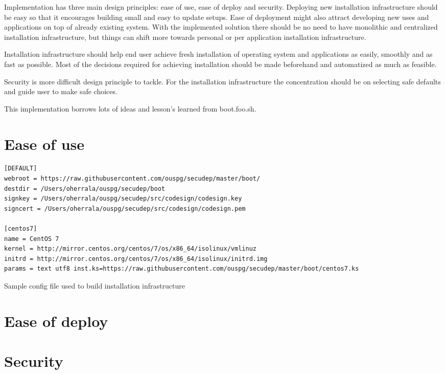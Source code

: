 
Implementation has three main design principles: ease of use, ease of
deploy and security. Deploying new installation infrastructure should
be easy so that it encourages building small and easy to update
setups. Ease of deployment might also attract developing new uses and
applications on top of already existing system. With the implemented
solution there should be no need to have monolithic and centralized
installation infrastructure, but things can shift more towards personal
or per application installation infrastructure.

Installation infrastructure should help end user achieve fresh
installation of operating system and applications as easily, smoothly
and as fast as possible. Most of the decisions required for achieving
installation should be made beforehand and automatized as much as
feasible.

Security is more difficult design principle to tackle. For the
installation infrastructure the concentration should be on selecting
safe defaults and guide user to make safe choices.

This implementation borrows lots of ideas and lesson's learned from
boot.foo.sh\cite{boot-foo-sh}.

\section{Ease of use}

\begin{table}[!ht]
\label{list:config}
  \begin{adjustwidth}{-3.5cm}{}
    \begin{scriptsize}
\begin{verbatim}
[DEFAULT]
webroot = https://raw.githubusercontent.com/ouspg/secudep/master/boot/
destdir = /Users/oherrala/ouspg/secudep/boot
signkey = /Users/oherrala/ouspg/secudep/src/codesign/codesign.key
signcert = /Users/oherrala/ouspg/secudep/src/codesign/codesign.pem

[centos7]
name = CentOS 7
kernel = http://mirror.centos.org/centos/7/os/x86_64/isolinux/vmlinuz
initrd = http://mirror.centos.org/centos/7/os/x86_64/isolinux/initrd.img
params = text utf8 inst.ks=https://raw.githubusercontent.com/ouspg/secudep/master/boot/centos7.ks
\end{verbatim}
    \end{scriptsize}
  \end{adjustwidth}
  \begin{center}
    \caption{Sample config file used to build
        installation infrastructure}
  \end{center}
\end{table}

\section{Ease of deploy}

\section{Security}
